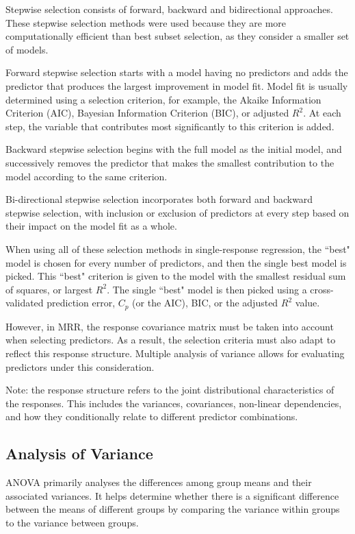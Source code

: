 \documentclass[11pt]{report} %
\begin{document}
\noindent Stepwise selection consists of forward, backward and bidirectional approaches. These stepwise selection methods were used because they are more computationally efficient than best subset selection, as they consider a smaller set of models. 

Forward stepwise selection starts with a model having no predictors and adds the predictor that produces the largest improvement in model fit. Model fit is usually determined using a selection criterion, for example, the Akaike Information Criterion (AIC), Bayesian Information Criterion (BIC), or adjusted $R^2$. At each step, the variable that contributes most significantly to this criterion is added. 

Backward stepwise selection begins with the full model as the initial model, and successively removes the predictor that makes the smallest contribution to the model according to the same criterion.

Bi-directional stepwise selection incorporates both forward and backward stepwise selection, with inclusion or exclusion of predictors at every step based on their impact on the model fit as a whole.

When using all of these selection methods in single-response regression, the ``best" model is chosen for every number of predictors, and then the single best model is picked. This ``best" criterion is given to the model with the smallest residual sum of squares, or largest $R^2$. The single ``best" model is then picked using a cross-validated prediction error, $C_p$ (or the AIC), BIC, or the adjusted $R^2$ value.

However, in MRR, the response covariance matrix must be taken into account when selecting predictors. As a result, the selection criteria must also adapt to reflect this response structure. Multiple analysis of variance allows for evaluating predictors under this consideration.

\vspace{0.1cm}
\noindent Note: the response structure refers to the joint distributional characteristics of the responses. This includes the variances, covariances, non-linear dependencies, and how they conditionally relate to different predictor combinations.\cite{pinheiro2006conditional}

\vspace{-0.3cm}
\subsection{Analysis of Variance}
ANOVA primarily analyses the differences among group means and their associated variances. It helps determine whether there is a significant difference between the means of different groups by comparing the variance within groups to the variance between groups. 
\end{document}
